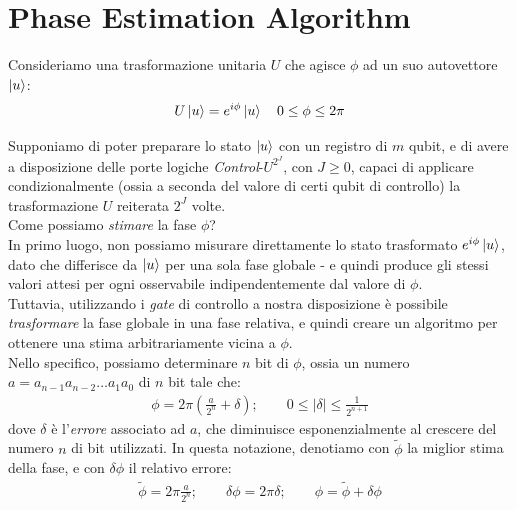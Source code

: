 \documentclass[../../InformazioneQuantistica.tex]{subfiles}
\begin{document}
\section{Phase Estimation Algorithm}

Consideriamo una trasformazione unitaria $U$ che agisce  $\phi$ ad un suo autovettore $\Ket{u}$:
\begin{align*}
U\Ket{u} = e^{i\phi}\Ket{u} \quad 0\leq \phi \leq 2\pi
\end{align*}

Supponiamo di poter preparare lo stato $\Ket{u}$ con un registro di $m$ qubit, e di avere a disposizione delle porte logiche \textit{Control}-$U^{2^J}$, con $J\geq 0$, capaci di applicare condizionalmente (ossia a seconda del valore di certi qubit di controllo) la trasformazione $U$ reiterata $2^J$ volte.\\
Come possiamo \textit{stimare} la fase $\phi$?\\

In primo luogo, non possiamo misurare direttamente lo stato trasformato $e^{i\phi}\Ket{u}$, dato che differisce da $\Ket{u}$ per una sola fase globale - e quindi produce gli stessi valori attesi per ogni osservabile indipendentemente dal valore di $\phi$.\\
Tuttavia, utilizzando i \textit{gate} di controllo a nostra disposizione è possibile \textit{trasformare} la fase globale in una fase relativa, e quindi creare un algoritmo per ottenere una stima arbitrariamente vicina a $\phi$.\\
Nello specifico, possiamo determinare $n$ bit di $\phi$, ossia un numero $a = a_{n-1} a_{n-2} \dots a_1 a_0$ di $n$ bit tale che:
\begin{align}
\phi = 2\pi \left(\frac{a}{2^n} + \delta \right); \qquad 0 \leq |\delta| \leq \frac{1}{2^{n+1}}
\label{eqn:phi}
\end{align}
dove $\delta$ è l'\textit{errore} associato ad $a$, che diminuisce esponenzialmente al crescere del numero $n$ di bit utilizzati. In questa notazione, denotiamo con $\tilde{\phi}$ la miglior stima della fase, e con $\delta \phi$ il relativo errore:
\begin{align*}
    \tilde{\phi} = 2\pi \frac{a}{2^n}; \qquad \delta\phi = 2\pi \delta; \qquad \phi = \tilde{\phi} + \delta\phi
\end{align*}
\end{document}
